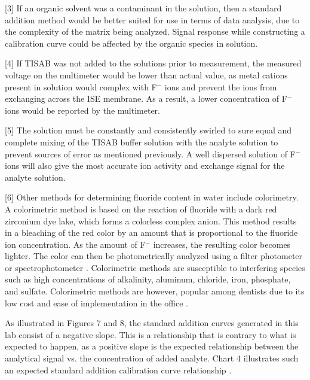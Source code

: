 \documentclass[journal=jacsat,manuscript=article,layout=twocolumn]{achemso}
\begin{document}
[3] If an organic solvent was a contaminant in the solution, then a standard
addition method would be better suited for use in terms of data analysis, due to
the complexity of the matrix being analyzed. Signal response while constructing
a calibration curve could be affected by the organic species in solution.

[4] If TISAB was not added to the solutions prior to measurement, the measured
voltage on the multimeter would be lower than actual value, as metal cations
present in solution would complex with F$^-$ ions and prevent the ions from
exchanging across the ISE membrane. As a result, a lower concentration of F$^-$
ions would be reported by the multimeter.

[5] The solution must be constantly and consistently swirled to sure equal and
complete mixing of the TISAB buffer solution with the analyte solution to
prevent sources of error as mentioned previously. A well dispersed solution of
F$^-$ ions will also give the most accurate ion activity and exchange signal for
the analyte solution.

[6] Other methods for determining fluoride content in water include colorimetry. A
colorimetric method is based on the reaction of fluoride with a dark red
zirconium dye lake, which forms a colorless complex anion. This method results
in a bleaching of the red color by an amount that is proportional to the
fluoride ion concentration. As the amount of F$^-$ increases, the resulting
color becomes lighter. The color can then be photometrically analyzed using a
filter photometer or spectrophotometer \cite{colo}.
Colorimetric methods are susceptible to interfering species such as high
concentrations of alkalinity, aluminum, chloride, iron, phosphate, and sulfate.
Colorimetric methods are however, popular among dentists due to its low cost and
ease of implementation in the office \cite{burton}.

As illustrated in Figures 7 and 8, the standard addition curves generated in
this lab consist of a negative slope. This is a relationship that is contrary to
what is expected to happen, as a positive slope is the expected relationship
between the analytical signal vs. the concentration of added analyte.
Chart 4 illustrates such an expected standard addition calibration curve
relationship \cite{csun}.
\end{document}
